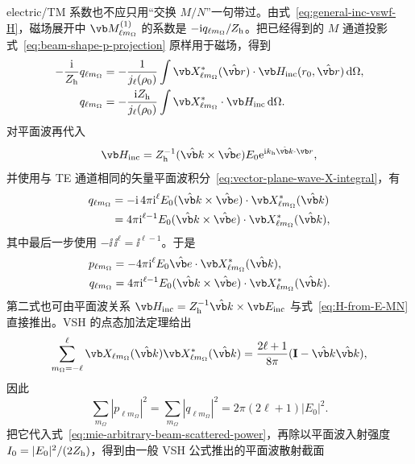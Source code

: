 electric/TM 系数也不应只用“交换 $M/N$”一句带过。由式~\cref{eq:general-inc-vswf-H}，磁场展开中 $\vb M_{\ell m_\Omega}^{(1)}$ 的系数是 $-\mathrm{i} q_{\ell m_\Omega}/Z_{\rm h}$。把已经得到的 $M$ 通道投影式~\cref{eq:beam-shape-p-projection} 原样用于磁场，得到
\begin{align}
-\frac{\ii}{Z_{\rm h}}q_{\ell m_\Omega}
&=-\frac{1}{j_\ell(\rho_0)}
\int \vb X_{\ell m_\Omega}^*(\hat{\vb r})
\cdot\vb H_{\rm inc}(r_0,\hat{\vb r})\,\dd\Omega,\\
q_{\ell m_\Omega}
&=-\frac{\ii Z_{\rm h}}{j_\ell(\rho_0)}
\int \vb X_{\ell m_\Omega}^*\cdot\vb H_{\rm inc}\,\dd\Omega.
\label{eq:q-from-H-projection}
\end{align}
对平面波再代入
\begin{equation}
\vb H_{\rm inc}=Z_{\rm h}^{-1}
(\hat{\vb k}\times\hat{\vb e})E_0
\ee^{\ii k_{\rm h}\hat{\vb k}\cdot\vb r},
\end{equation}
并使用与 TE 通道相同的矢量平面波积分~\cref{eq:vector-plane-wave-X-integral}，有
\begin{align}
q_{\ell m_\Omega}
&=-\ii\,4\pi\ii^\ell E_0
(\hat{\vb k}\times\hat{\vb e})\cdot
\vb X_{\ell m_\Omega}^*(\hat{\vb k})\\
&=4\pi\ii^{\ell-1}E_0
(\hat{\vb k}\times\hat{\vb e})\cdot
\vb X_{\ell m_\Omega}^*(\hat{\vb k}),
\end{align}
其中最后一步使用 $-\ii\,\ii^\ell=\ii^{\ell-1}$。于是
\begin{align}
p_{\ell m_{\Omega}}
&=-4\pi\ii^\ell E_0
\hat{\vb e}\cdot
\vb X_{\ell m_{\Omega}}^*(\hat{\vb k}),
\\
q_{\ell m_{\Omega}}
&=4\pi\ii^{\ell-1}E_0
(\hat{\vb k}\times\hat{\vb e})\cdot
\vb X_{\ell m_{\Omega}}^*(\hat{\vb k}).
\label{eq:plane-wave-beam-shape-coefficients}
\end{align}
第二式也可由平面波关系
$\vb H_{\rm inc}=Z_{\rm h}^{-1}\hat{\vb k}\times\vb E_{\rm inc}$
与式~\cref{eq:H-from-E-MN} 直接推出。VSH 的点态加法定理给出
\begin{equation}
\sum_{m_{\Omega}=-\ell}^{\ell}
\vb X_{\ell m_{\Omega}}(\hat{\vb k})
\vb X_{\ell m_{\Omega}}^*(\hat{\vb k})
=\frac{2\ell+1}{8\pi}
(\mathbf I-\hat{\vb k}\hat{\vb k}),
\end{equation}
因此
\begin{equation}
\sum_{m_{\Omega}}|p_{\ell m_{\Omega}}|^2
=\sum_{m_{\Omega}}|q_{\ell m_{\Omega}}|^2
=2\pi(2\ell+1)|E_0|^2.
\end{equation}
把它代入式~\cref{eq:mie-arbitrary-beam-scattered-power}，再除以平面波入射强度
$I_0=|E_0|^2/(2Z_{\rm h})$，得到由一般 VSH 公式推出的平面波散射截面
